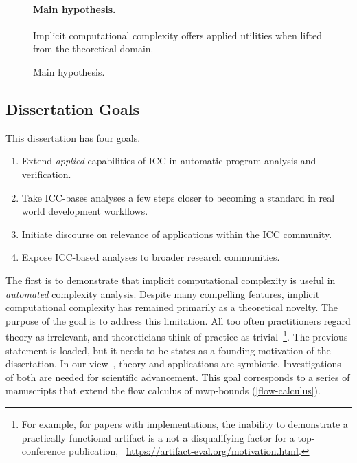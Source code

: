 \begin{figure}[t]
\begin{mdframed}
\paragraph*{Main hypothesis.}
Implicit computational complexity offers applied utilities when lifted from the theoretical domain.
\end{mdframed}
\caption[Main hypothesis summarized]{Main hypothesis.}
\label{fig:hypothesis}
\end{figure}

\subsection{Dissertation Goals}\label{subsec:specific-aims}

This dissertation has four goals.

\begin{enumerate}
\item Extend \emph{applied} capabilities of ICC in automatic program analysis and verification.
\item Take ICC-bases analyses a few steps closer to becoming a standard in real world development workflows.
\item Initiate discourse on relevance of applications within the ICC community.
\item Expose ICC-based analyses to broader research communities.
\end{enumerate}

The first is to demonstrate that implicit computational complexity is useful in \emph{automated} complexity analysis.
Despite many compelling features, implicit computational complexity has remained primarily as a theoretical novelty.
The purpose of the goal is to address this limitation.
All too often practitioners regard theory as irrelevant, and theoreticians think of practice as trivial~\cite[pg. xxxv]{bishop2003}\footnote{
For example, for papers with implementations, the inability to demonstrate a practically functional artifact is a not a disqualifying factor for a top-conference publication,
\cf\eg~\url{https://artifact-eval.org/motivation.html}.}.
The previous statement is loaded, but it needs to be states as a founding motivation of the dissertation.
In our view~\cite[p. 75]{moyen2017}, theory and applications are symbiotic.
Investigations of both are needed for scientific advancement.
This goal corresponds to a series of manuscripts that extend the flow calculus of mwp-bounds (\autoref{flow-calculus}).

